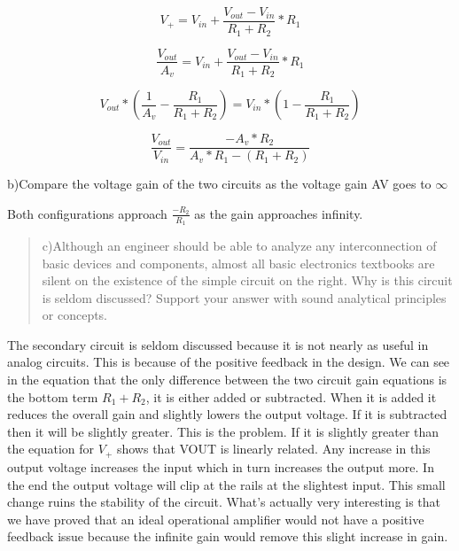 \documentclass[10pt,a4paper]{article}
\begin{document}
\begin{equation}
V_+ = V_{in} + \frac{V_{out} - V_{in}}{R_1 + R_2} * R_1
\end{equation}

\begin{equation}
\frac{V_{out}}{A_v} = V_{in} + \frac{V_{out} - V_{in}}{R_1 + R_2} * R_1
\end{equation}

\begin{equation}
V_{out} * (\frac{1}{A_v} - \frac{R_1}{R_1 +R_2}) = V_{in} *( 1 - \frac{R_1}{R_1 + R_2})
\end{equation}

\begin{equation}
\frac{V_{out}}{V_{in}} =  \frac{-A_v *R_2}{A_v *R_1 - (R_1 + R_2)}
\end{equation}




b)Compare the voltage gain of the two circuits as the voltage gain AV
goes to $\infty$

Both configurations approach $\frac{-R_2}{R_1}$ as the gain approaches infinity.


\begin{quote}
c)Although an engineer should be able to analyze any interconnection of
basic devices and components, almost all basic electronics textbooks are
silent on the existence of the simple circuit on the right. Why is this
circuit is seldom discussed? Support your answer with sound analytical
principles or concepts.
\end{quote}

The secondary circuit is seldom discussed because it is not nearly as useful in analog circuits. This is because of the positive feedback in the design. We can see in the equation that the only difference between the two circuit gain equations is the bottom term $R_1+R_2$, it is either added or subtracted. When it is added it reduces the overall gain and slightly lowers the output voltage. If it is subtracted then it will be slightly greater. This is the problem. If it is slightly greater than the equation for $V_+$ shows that VOUT is linearly related. Any increase in this output voltage increases the input which in turn increases the output more. In the end the output voltage will clip at the rails at the slightest input. This small change ruins the stability of the circuit. What's actually very interesting is that we have proved that an ideal operational amplifier would not have a positive feedback issue because the infinite gain would remove this slight increase in gain.  
\end{document}
